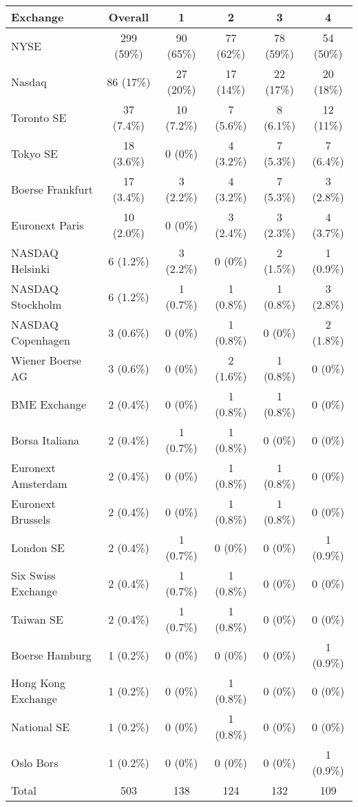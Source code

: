 \documentclass[12pt]{article}
\begin{document}
\begin{table}
    \centering
    \label{tab:exchngs_sale}
    
    \begin{tabular}{lccccc}
        \toprule
        Exchange & Overall & 1 & 2 & 3 & 4 \\
        \midrule
        NYSE & 299 (59\%) & 90 (65\%) & 77 (62\%) & 78 (59\%) & 54 (50\%)\\
        Nasdaq & 86 (17\%) & 27 (20\%) & 17 (14\%) & 22 (17\%) & 20 (18\%)\\
        Toronto SE & 37 (7.4\%) & 10 (7.2\%) & 7 (5.6\%) & 8 (6.1\%) & 12 (11\%)\\
        Tokyo SE & 18 (3.6\%) & 0 (0\%) & 4 (3.2\%) & 7 (5.3\%) & 7 (6.4\%)\\
        Boerse Frankfurt & 17 (3.4\%) & 3 (2.2\%) & 4 (3.2\%) & 7 (5.3\%) & 3 (2.8\%)\\
        Euronext Paris & 10 (2.0\%) & 0 (0\%) & 3 (2.4\%) & 3 (2.3\%) & 4 (3.7\%)\\
        NASDAQ Helsinki & 6 (1.2\%) & 3 (2.2\%) & 0 (0\%) & 2 (1.5\%) & 1 (0.9\%)\\
        NASDAQ Stockholm & 6 (1.2\%) & 1 (0.7\%) & 1 (0.8\%) & 1 (0.8\%) & 3 (2.8\%)\\
        NASDAQ Copenhagen & 3 (0.6\%) & 0 (0\%) & 1 (0.8\%) & 0 (0\%) & 2 (1.8\%)\\
        Wiener Boerse AG & 3 (0.6\%) & 0 (0\%) & 2 (1.6\%) & 1 (0.8\%) & 0 (0\%)\\
        BME Exchange & 2 (0.4\%) & 0 (0\%) & 1 (0.8\%) & 1 (0.8\%) & 0 (0\%)\\
        Borsa Italiana & 2 (0.4\%) & 1 (0.7\%) & 1 (0.8\%) & 0 (0\%) & 0 (0\%)\\
        Euronext Amsterdam & 2 (0.4\%) & 0 (0\%) & 1 (0.8\%) & 1 (0.8\%) & 0 (0\%)\\
        Euronext Brussels & 2 (0.4\%) & 0 (0\%) & 1 (0.8\%) & 1 (0.8\%) & 0 (0\%)\\
        London SE & 2 (0.4\%) & 1 (0.7\%) & 0 (0\%) & 0 (0\%) & 1 (0.9\%)\\
        Six Swiss Exchange & 2 (0.4\%) & 1 (0.7\%) & 1 (0.8\%) & 0 (0\%) & 0 (0\%)\\
        Taiwan SE & 2 (0.4\%) & 1 (0.7\%) & 1 (0.8\%) & 0 (0\%) & 0 (0\%)\\
        Boerse Hamburg & 1 (0.2\%) & 0 (0\%) & 0 (0\%) & 0 (0\%) & 1 (0.9\%)\\
        Hong Kong Exchange & 1 (0.2\%) & 0 (0\%) & 1 (0.8\%) & 0 (0\%) & 0 (0\%)\\
        National SE & 1 (0.2\%) & 0 (0\%) & 1 (0.8\%) & 0 (0\%) & 0 (0\%)\\
        Oslo Bors & 1 (0.2\%) & 0 (0\%) & 0 (0\%) & 0 (0\%) & 1 (0.9\%)\\
        \midrule
        Total & 503 & 138 & 124 & 132 & 109\\
        \bottomrule
    \end{tabular}


\end{table}
\end{document}
